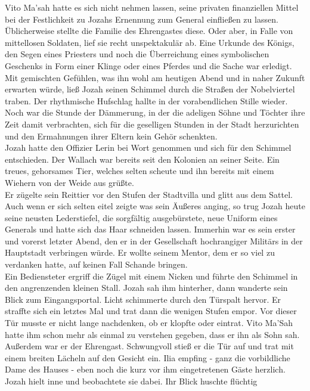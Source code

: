 Vito Ma'sah hatte es sich nicht nehmen lassen, seine privaten finanziellen Mittel bei der 
Festlichkeit zu Jozahs Ernennung zum General einfließen zu lassen. Üblicherweise stellte die 
Familie des Ehrengastes diese. Oder aber, in Falle von mittellosen Soldaten, lief sie recht 
unspektakulär ab. Eine Urkunde des Königs, den Segen eines Priesters und noch die Überreichung 
eines symbolischen Geschenks in Form einer Klinge oder eines Pferdes und die Sache war erledigt.\\
Mit gemischten Gefühlen, was ihn wohl am heutigen Abend und in naher Zukunft erwarten würde, ließ 
Jozah seinen Schimmel durch die Straßen der Nobelviertel traben. Der rhythmische Hufschlag hallte 
in der vorabendlichen Stille wieder. Noch war die Stunde der Dämmerung, in der die adeligen Söhne 
und Töchter ihre Zeit damit verbrachten, sich für die geselligen Stunden in der Stadt herzurichten 
und den Ermahnungen ihrer Eltern kein Gehör schenkten.\\
Jozah hatte den Offizier Lerin bei Wort genommen und sich für den Schimmel entschieden. Der Wallach 
war bereits seit den Kolonien an seiner Seite. Ein treues, gehorsames Tier, welches selten scheute 
und ihn bereits mit einem Wiehern von der Weide aus grüßte.\\
Er zügelte sein Reittier vor den Stufen der Stadtvilla und glitt aus dem Sattel. Auch wenn er sich 
selten eitel zeigte was sein Äußeres anging, so trug Jozah heute seine neusten Lederstiefel, die 
sorgfältig ausgebürstete, neue Uniform eines Generals und hatte sich das Haar schneiden lassen. 
Immerhin war es sein erster und vorerst letzter Abend, den er in der Gesellschaft hochrangiger 
Militärs in der Hauptstadt verbringen würde. Er wollte seinem Mentor, dem er so viel zu verdanken 
hatte, auf keinen Fall Schande bringen.\\
Ein Bediensteter ergriff die Zügel mit einem Nicken und führte den Schimmel in den angrenzenden 
kleinen Stall. Jozah sah ihm hinterher, dann wanderte sein Blick zum Eingangsportal. Licht 
schimmerte durch den Türspalt hervor. Er straffte sich ein letztes Mal und trat dann die wenigen 
Stufen empor. Vor dieser Tür musste er nicht lange nachdenken, ob er klopfte oder eintrat. Vito 
Ma'Sah hatte ihm schon mehr als einmal zu verstehen gegeben, dass er ihn als Sohn sah. Außerdem war 
er der Ehrengast. Schwungvoll stieß er die Tür auf und trat mit einem breiten Lächeln auf den 
Gesicht ein. Ilia empfing - ganz die vorbildliche Dame des Hauses - eben noch die kurz vor ihm 
eingetretenen Gäste herzlich. Jozah hielt inne und beobachtete sie dabei. Ihr Blick huschte flüchtig 

